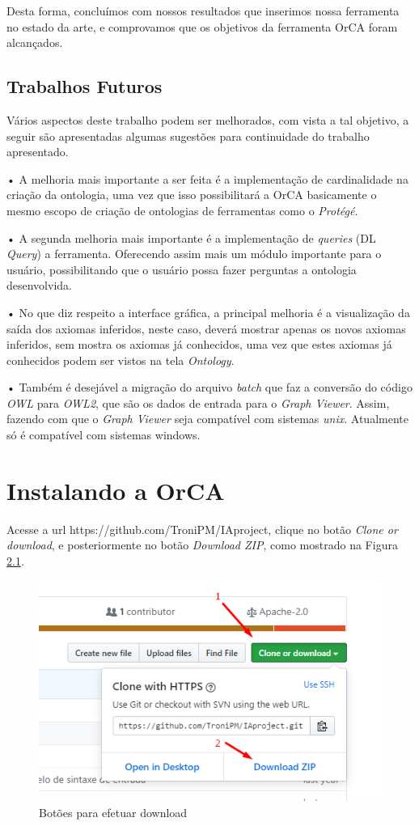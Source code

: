 \documentclass{bcc}
\begin{document}
Desta forma, concluímos com nossos resultados que inserimos nossa ferramenta no estado da arte, e comprovamos que os objetivos da ferramenta OrCA foram alcançados.

\section{Trabalhos Futuros}

Vários aspectos deste trabalho podem ser melhorados, com vista a tal
objetivo, a seguir são apresentadas algumas sugestões para continuidade do trabalho apresentado.

• A melhoria mais importante a ser feita é a implementação de cardinalidade na criação da ontologia, uma vez que isso possibilitará a OrCA basicamente o mesmo escopo de criação de ontologias de ferramentas como o \textit{Protégé}.

• A segunda melhoria mais importante é a implementação de \textit{queries} (DL \textit{Query}) a ferramenta. Oferecendo assim mais um módulo importante para o usuário, possibilitando que o usuário possa fazer perguntas a ontologia desenvolvida.

• No que diz respeito a interface gráfica, a principal melhoria é a visualização da saída dos axiomas inferidos, neste caso, deverá mostrar apenas os novos axiomas inferidos, sem mostra os axiomas já conhecidos, uma vez que estes axiomas já conhecidos podem ser vistos na tela \textit{Ontology}.

• Também é desejável a migração do arquivo \textit{batch} que faz a conversão do código \textit{OWL} para \textit{OWL2}, que são os dados de entrada para o \textit{Graph Viewer}. Assim, fazendo com que o \textit{Graph Viewer} seja compatível com sistemas \textit{unix}. Atualmente só é compatível com sistemas windows.





\appendix
\chapter{Instalando a OrCA}
\label{chap:apInstalacao}
Acesse a url https://github.com/TroniPM/IAproject, clique no botão \textit{Clone or download}, e posteriormente no botão \textit{Download ZIP}, como mostrado na Figura \ref{fig:install1}.

\begin{figure}[H]
\centering
\includegraphics[width=.7\textwidth]{Figuras/install1.png}
\caption{Botões para efetuar download} 
\label{fig:install1}
\end{figure}
\end{document}
